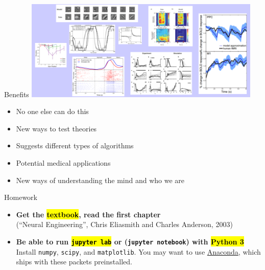 \documentclass[handout,aspectratio=169]{beamer}
\begin{document}
\begin{frame}{Benefits}
	\centering
	\vspace{0.25cm}
	\includegraphics[width=0.85\textwidth]{media/compare.png}
	\begin{multicols}{2}
	\begin{itemize}		
		\setlength\itemsep{0.25cm}
		\item No one else can do this
		\item New ways to test theories
		\item Suggests different types of algorithms
		\item Potential medical applications
		\item New ways of understanding the mind and who we are		
	\end{itemize}
	\end{multicols}
\end{frame}

\begin{frame}{Homework}
	\begin{itemize}
		\setlength{\itemsep}{0.5cm}
		\item \textbf{Get the \hl{textbook}, read the first chapter}\\
		(\enquote{Neural Engineering}, Chris Eliasmith and Charles Anderson, 2003)
		\item \textbf{Be able to run \hl{\texttt{jupyter lab}} or (\texttt{jupyter notebook}) with \hl{Python 3}}\\
		Install \texttt{numpy}, \texttt{scipy}, and \texttt{matplotlib}. You may want to use \href{https://www.anaconda.com/distribution/}{Anaconda}, which ships with these packets preinstalled.
	\end{itemize}
\end{frame}
\end{document}
